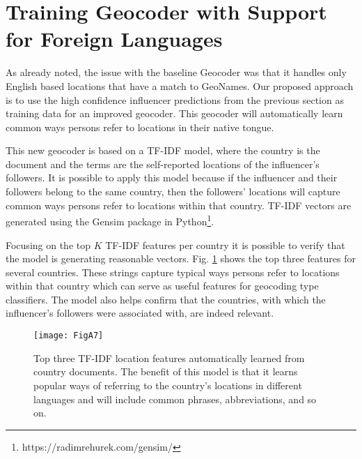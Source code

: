 \section{Training Geocoder with Support for Foreign Languages}

As already noted, the issue with the baseline Geocoder was that it handles only English based locations that have a match to GeoNames. Our proposed approach is to use the high confidence influencer predictions from the previous section as training data for an improved geocoder. This geocoder will automatically learn common ways persons refer to locations in their native tongue. 

This new geocoder is based on a TF-IDF model, where the country is the document and the terms are the self-reported locations of the influencer's followers. It is possible to apply this model because if the influencer and their followers belong to the same country, then the followers' locations will capture common ways persons refer to locations within that country. TF-IDF vectors are generated using the Gensim package in Python\footnote{https://radimrehurek.com/gensim/}. 

\iffalse
From equation \eqref{eq122}, the weights of TF-IDF are based on the frequency of term $i$ in document $j$ times log inverse ratio of total documents with the term over total $D$ documents. 
\begin{equation}
TF-IDF_{i,j} = frequency_{i,j}*log_2\frac{D}{doc_{freq_i}}\label{eq122}
\end{equation}
\fi

Focusing on the top $K$ TF-IDF features per country it is possible to verify that the model is generating reasonable vectors. Fig. \ref{fig_7app} shows the top three features for several countries. These strings capture typical ways persons refer to locations within that country which can serve as useful features for geocoding type classifiers. The model also helps confirm that the countries, with which the influencer's followers were associated with, are indeed relevant.

\begin{figure}[!t]
\centering
\texttt{[image: FigA7]}
\caption[Features from Multilingual TF-IDF Geocoder]{Top three TF-IDF location features automatically learned from country documents. The benefit of this model is that it learns popular ways of referring to the country's locations in different languages and will include common phrases, abbreviations, and so on.}
\label{fig_7app}
\end{figure}

